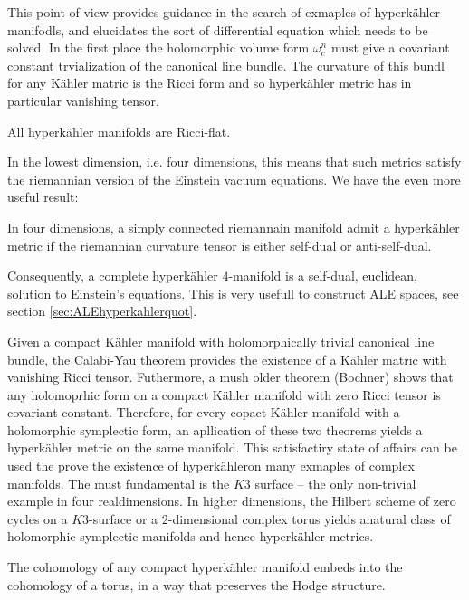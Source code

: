 \documentclass{worksheetclass}
\begin{document}
        This point of view provides guidance in the search of exmaples of hyperkähler manifodls, and elucidates the sort of differential equation which needs to be solved. In the first place the holomorphic volume form $\omega_c^n$ must give a covariant constant trvialization of the canonical line bundle. The curvature of this bundl for any Kähler matric is the Ricci form and so hyperkähler metric has in particular vanishing tensor.
        \begin{prop}
            All hyperkähler manifolds are Ricci-flat.
        \end{prop}
        In the lowest dimension, i.e. four dimensions, this means that such metrics satisfy the riemannian version of the Einstein vacuum equations. We have the even more useful result:
        \begin{prop}
            In four dimensions, a simply connected riemannain manifold admit a hyperkähler metric if the riemannian curvature tensor is either self-dual or anti-self-dual.
        \end{prop}
        Consequently, a complete hyperkähler $4$-manifold is a self-dual, euclidean, solution to Einstein's equations. This is very usefull to construct ALE spaces, see section \ref{sec:ALEhyperkahlerquot}.

        Given a compact Kähler manifold with holomorphically trivial canonical line bundle, the Calabi-Yau theorem provides the existence of a Kähler matric with vanishing Ricci tensor. Futhermore, a mush older theorem (Bochner) shows that any holomoprhic form on a compact Kähler manifold with zero Ricci tensor is covariant constant. Therefore, for every copact Kähler manifold  with a holomorphic symplectic form, an apllication of these two theorems yields a hyperkähler metric on the same manifold. This satisfactiry state of affairs can be used the prove the existence of hyperkähleron many exmaples of complex manifolds. The must fundamental is the $K3$ surface -- the only non-trivial example in four realdimensions. In higher dimensions, the Hilbert scheme of zero cycles on a $K3$-surface or a $2$-dimensional complex torus yields anatural class of holomorphic symplectic manifolds and hence hyperkähler metrics.

        \begin{theorem}
            The cohomology of any compact hyperkähler manifold embeds into the cohomology of a torus, in a way that preserves the Hodge structure.
        \end{theorem}
\end{document}
